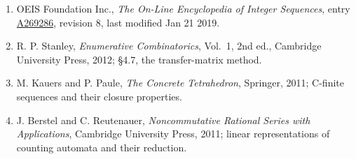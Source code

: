 \documentclass[11pt]{article}
\theoremstyle{definition}
\begin{document}
\begin{enumerate}

\item OEIS Foundation Inc., \emph{The On-Line Encyclopedia of Integer Sequences}, entry \href{https://oeis.org/A269286}{A269286}, revision 8, last modified Jan 21 2019.

\item R. P. Stanley, \emph{Enumerative Combinatorics}, Vol.~1, 2nd ed., Cambridge University Press, 2012; \S4.7, the transfer-matrix method.

\item M. Kauers and P. Paule, \emph{The Concrete Tetrahedron}, Springer, 2011; C-finite sequences and their closure properties.

\item J. Berstel and C. Reutenauer, \emph{Noncommutative Rational Series with Applications}, Cambridge University Press, 2011; linear representations of counting automata and their reduction.

\end{enumerate}
\end{document}
